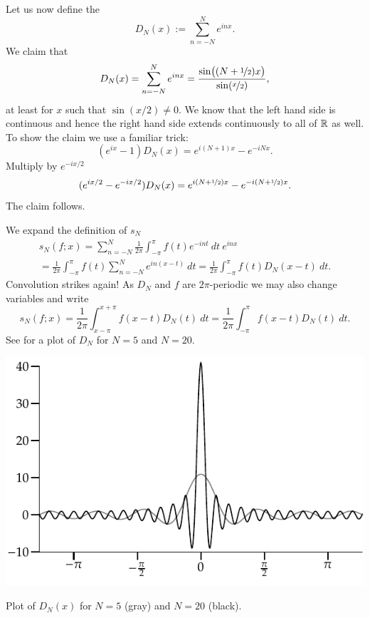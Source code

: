 Let us now define the \emph{}
\begin{equation*}
D_N(x) := \sum_{n=-N}^N e^{inx} .
\end{equation*}
We claim that
\begin{equation*}
D_N(x) =
\sum_{n=-N}^N e^{inx}
=
\frac{\sin\bigl( (N+\nicefrac{1}{2})x \bigr)}{\sin(\nicefrac{x}{2})} ,
\end{equation*}
at least for $x$ such that $\sin(x/2) \not= 0$.  We know that the left hand
side is continuous and hence the right hand side extends continuously to
all of ${\mathbb{R}}$ as well.
To show the claim
we use a familiar trick:
\begin{equation*}
(e^{ix}-1) D_N(x) = e^{i(N+1)x} - e^{-iNx} .
\end{equation*}
Multiply by $e^{-ix/2}$
\begin{equation*}
(e^{ix/2}-e^{-ix/2}) D_N(x) = e^{i(N+\nicefrac{1}{2})x} -
e^{-i(N+\nicefrac{1}{2})x} .
\end{equation*}
The claim follows.

We expand the definition of $s_N$
\begin{multline*}
s_N(f;x) = 
\sum_{n=-N}^N \frac{1}{2\pi} \int_{-\pi}^\pi f(t) e^{-int}  ~  dt ~ e^{inx}
\\
=
\frac{1}{2\pi} \int_{-\pi}^\pi f(t) \sum_{n=-N}^N e^{in(x-t)} ~ dt
=
\frac{1}{2\pi} \int_{-\pi}^\pi f(t) D_N(x-t) ~ dt .
\end{multline*}
Convolution strikes again!
As $D_N$ and $f$ are $2\pi$-periodic we may also change variables and write 
\begin{equation*}
s_N(f;x) = 
\frac{1}{2\pi} \int_{x-\pi}^{x+\pi} f(x-t) D_N(t) ~ dt
=
\frac{1}{2\pi} \int_{-\pi}^\pi f(x-t) D_N(t) ~ dt .
\end{equation*}
See  for a plot of $D_N$ for $N=5$ and $N=20$.

\begin{myfigureht}
\includegraphics{figures/approxdeltas}
\caption{Plot of $D_N(x)$ for $N=5$ (gray) and $N=20$
(black).\label{fig:approxdeltas}}
\end{myfigureht}

